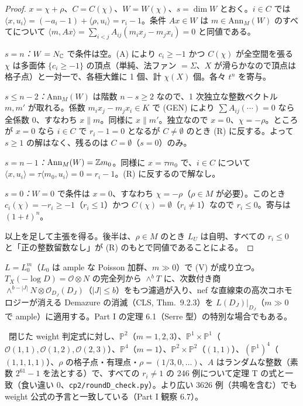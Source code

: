 \begin{proof}
$x=\chi+\rho$、$C=C(\chi)$、$W=W(\chi)$、$s=\dim W$ とおく。$i\in C$ では $\langle x,u_i\rangle=(-a_i-1)+\langle\rho,u_i\rangle=r_i-1$。条件 $Ax\in W$ は $m\in\mathrm{Ann}_M(W)$ のすべてについて $\langle m,Ax\rangle=\sum_{i<j}A_{ij}(m_ix_j-m_jx_i)=0$ と同値である。

\emph{$s=n$：}$W=N_\mathbb C$ で条件は空。(A) により $c_i\ge-1$ かつ $C(\chi)$ が全空間を張る $\chi$ は多面体 $\{c_i\ge-1\}$ の頂点（単純、法ファン $=\Sigma$、$X$ が滑らかなので頂点は格子点）と一対一で、各極大錐に 1 個、計 $\chi(X)$ 個。各々 $t^n$ を寄与。

\emph{$s\le n-2$：}$\mathrm{Ann}_M(W)$ は階数 $n-s\ge2$ なので、1 次独立な整数ベクトル $m,m'$ が取れる。係数 $m_ix_j-m_jx_i\in K$ で (GEN) により $\sum A_{ij}(\cdots)=0$ なら全係数 0、すなわち $x\parallel m$。同様に $x\parallel m'$。独立なので $x=0$、$\chi=-\rho$。ところが $x=0$ なら $i\in C$ で $r_i-1=0$ となるが $C\ne\emptyset$ のとき (R) に反する。よって $s\ge1$ の解はなく、残るのは $C=\emptyset$（$s=0$）のみ。

\emph{$s=n-1$：}$\mathrm{Ann}_M(W)=\mathbb Z m_0$。同様に $x=\tau m_0$ で、$i\in C$ について $\langle x,u_i\rangle=\tau\langle m_0,u_i\rangle=0=r_i-1$。(R) に反するので解なし。

\emph{$s=0$：}$W=0$ で条件は $x=0$、すなわち $\chi=-\rho$（$\rho\in M$ が必要）。このとき $c_i(\chi)=-r_i\ge-1$（$r_i\le1$）かつ $C(\chi)=\emptyset$（$r_i\ne1$）なので $r_i\le0$。寄与は $(1+t)^n$。

以上を足して主張を得る。後半は、$\rho\in M$ のとき $L_U$ は自明、すべての $r_i\le0$ と「正の整数留数なし」が (R) のもとで同値であることによる。\qedhere
\end{proof}
\begin{rem}[(V) について\ \tC]
$L=L_0^m$（$L_0$ は ample な Poisson 加群、$m\gg0$）で (V) が成り立つ。$T_X(-\log D)=\mathcal O\otimes N$ の完全列から $\wedge^bT$ に、次数付き商 $\wedge^{b-|J|}N\otimes\mathcal O_{D_J}(D_J)$（$|J|\le b$）をもつ濾過が入り、nef な直線束の高次コホモロジーが消える Demazure の消滅（CLS, Thm.\ 9.2.3\tQ）を $L(D_J)|_{D_J}$（$m\gg0$ で ample）に適用する。Part I の定理 6.1（Serre 型）の特別な場合でもある。
\end{rem}
\tV\ 閉じた weight 判定式に対し、$\mathbb{P}^2$（$m=1,2,3$）、$\mathbb{P}^1\times\mathbb{P}^1$（$\mathcal O(1,1),\mathcal O(1,2),\mathcal O(2,3)$）、$\mathbb{P}^4$（$m=1$）、$\mathbb{P}^2\times\mathbb{P}^2$（$(1,1)$）、$(\mathbb{P}^1)^4$（$(1,1,1,1)$）、$\rho$ の格子点・有理点・$\rho=(1/3,0,\dots)$、$A$ はランダムな整数（素数 $2^{61}-1$ を法とする）で、すべての $r_i\ne1$ の 246 例について定理 T の式と一致（食い違い 0、\texttt{cp2/roundD\_check.py}）。より広い 3626 例（共鳴を含む）でも weight 公式の予言と一致している（Part I 観察 6.7）。

